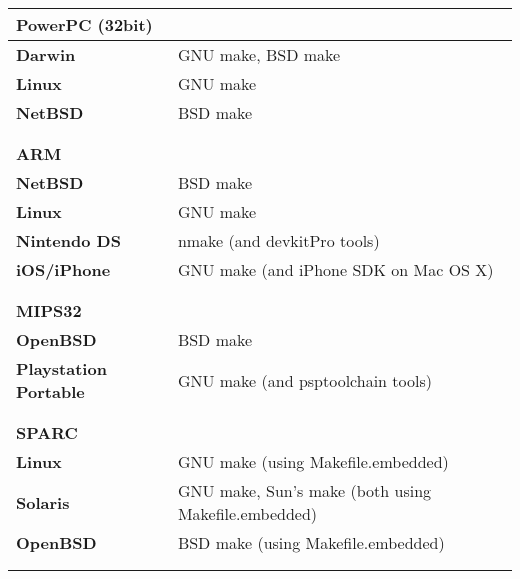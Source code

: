 \begin{tabular}{l l}
{\bf{\large PowerPC (32bit)}} &                                                      \\
\hline\hline
{\bf Darwin}                  & GNU make, BSD make                                   \\
{\bf Linux}                   & GNU make                                             \\
{\bf NetBSD}                  & BSD make                                             \\
\hline
                              &                                                      \\
                              &                                                      \\


{\bf{\large ARM}}             &                                                      \\
\hline\hline
{\bf NetBSD}                  & BSD make                                             \\
{\bf Linux}                   & GNU make                                             \\
{\bf Nintendo DS}             & nmake (and devkitPro\cite{devkitPro} tools)          \\
{\bf iOS/iPhone}              & GNU make (and iPhone SDK on Mac OS X)                \\
\hline
                              &                                                      \\
                              &                                                      \\

{\bf{\large MIPS32}}          &                                                      \\
\hline\hline
{\bf OpenBSD}                 & BSD make                                             \\
{\bf Playstation Portable}    & GNU make (and psptoolchain\cite{psptoolchain} tools) \\
\hline
                              &                                                      \\
                              &                                                      \\

{\bf{\large SPARC}}           &                                                      \\
\hline\hline
{\bf Linux}                   & GNU make (using Makefile.embedded)                   \\
{\bf Solaris}                 & GNU make, Sun's make (both using Makefile.embedded)  \\
{\bf OpenBSD}                 & BSD make (using Makefile.embedded)                   \\
\hline
                              &                                                      \\
                              &                                                      \\


\end{tabular}
